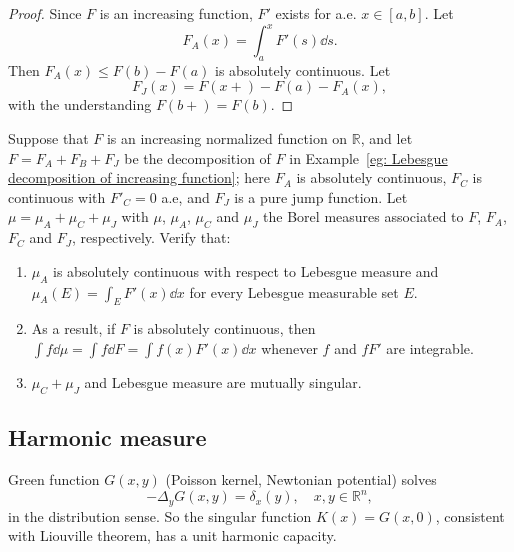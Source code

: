 \begin{proof}
  Since $F$ is an increasing function, $F'$ exists for a.e. $x \in [a, b]$.
  Let 
  \[
  F_A(x) = \int_a^xF'(s)\dd s.
  \]
  Then $F_A(x) \leq F(b) - F(a)$ is absolutely continuous.
  Let 
  \[
  F_J(x) = F(x+) - F(a) - F_A(x),
  \]
  with the understanding $F(b+) = F(b)$.
  
\end{proof}

\begin{example}
  Suppose that $F$ is an increasing normalized function on $\mathbb R$,
  and let $F = F_A + F_B + F_J$ be the decomposition of $F$ in Example~\ref*{eg: Lebesgue decomposition of increasing function};
  here $F_A$ is absolutely continuous, $F_C$ is continuous with $F'_C = 0$ a.e, and $F_J$ is a pure jump function.
  Let $\mu = \mu_A + \mu_C + \mu_J$ with $\mu$, $\mu_A$, $\mu_C$ and $\mu_J$ the Borel measures associated to $F$, $F_A$, $F_C$ and $F_J$, respectively.
  Verify that:
  \begin{enumerate}
    \item $\mu_A$ is absolutely continuous with respect to Lebesgue measure and $\mu_A(E) = \int_EF'(x)\dd x$ for every Lebesgue measurable set $E$.
    \item As a result, if $F$ is absolutely continuous, then $\int f\dd\mu = \int f\dd F = \int f(x)F'(x)\dd x$ whenever $f$ and $fF'$ are integrable.
    \item $\mu_C + \mu_J$ and Lebesgue measure are mutually singular.
  \end{enumerate}
\end{example}


\subsection{Harmonic measure}

Green function $G(x,y)$ (Poisson kernel, Newtonian potential) solves 
\[
-\Delta_y G(x,y) = \delta_x(y), \quad x,y\in\mathbb R^n,
\]
in the distribution sense. 
So the singular function $K(x) = G(x,0)$, consistent with Liouville theorem,
has a unit harmonic capacity.

